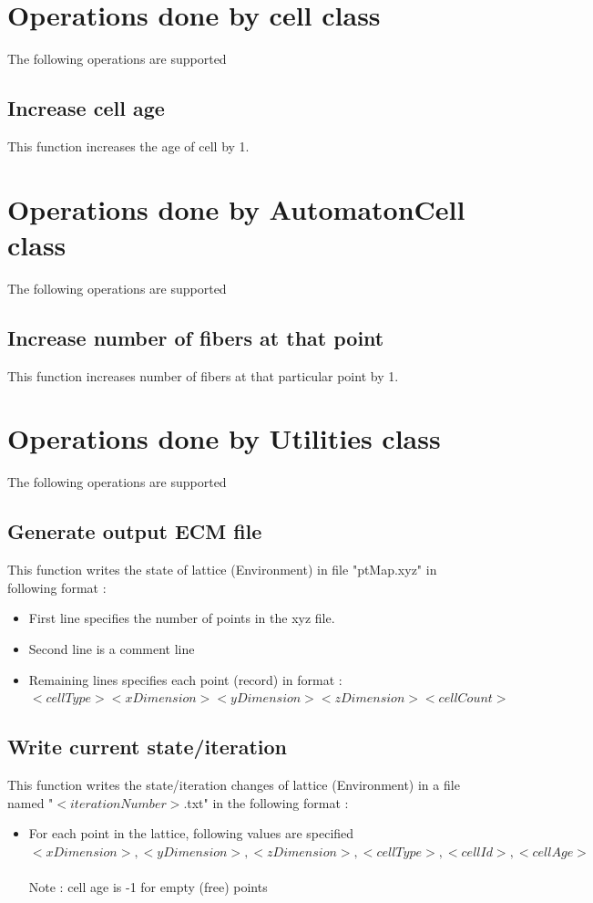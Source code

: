 \documentclass[11pt]{report}
\begin{document}
  \section{\color{red} Operations done by cell class}
  The following operations are supported
  \subsection{\color{blue}Increase cell age}
  This function increases the age of cell by 1.
  
  \section{\color{red} Operations done by AutomatonCell class}
  The following operations are supported
  \subsection{\color{blue}Increase number of fibers at that point}
  This function increases number of fibers at that particular point by 1.
  
  \section{\color{red} Operations done by Utilities class}
  The following operations are supported
  \subsection{\color{blue}Generate output ECM file}
  This function writes the state of lattice (Environment) in file "ptMap.xyz" in following format : \\
  \begin{itemize}
    \item First line specifies the number of points in the xyz file.
    \item Second line is a comment line
    \item Remaining lines specifies each point (record) in format : \\
    $<cell Type> <x Dimension> <y Dimension> <z Dimension> <cell Count>$
   \end{itemize}
   \subsection{\color{blue}Write current state/iteration}
   This function writes the state/iteration changes of lattice (Environment) in a file named "$<iterationNumber>$.txt" in the following format :
   \begin{itemize}
    \item For each point in the lattice, following values are specified \\
    $<x Dimension>,<y Dimension>,<z Dimension>,<cell Type>,<cell Id>,<cell Age>$ \\ \\
    Note : cell age is -1 for empty (free) points 
   \end{itemize}
  
\end{document}
